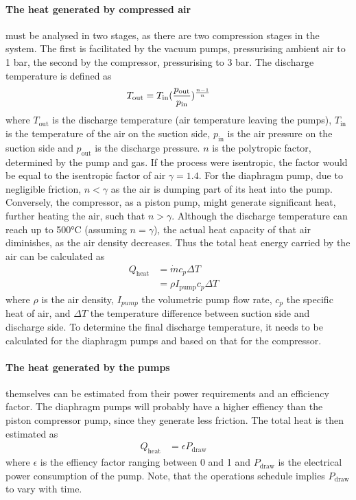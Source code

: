 \documentclass[
  a4paper,
  11pt,
  openany,
  parskip,
  toc=totoc,
  listof=totoc,
  bibliography=totoc
]{scrreprt}
\let\qty\relax
\newcommand{\qty}[1]{\left( #1 \right)}
\newcommand{\qc}{\quad}
\begin{document}
\paragraph{The heat generated by compressed air} must be analysed in two stages, as there are two compression stages in the system. The first is facilitated by the vacuum pumps, pressurising ambient air to 1 bar, the second by the compressor, pressurising to 3 bar. The discharge temperature is defined as 
\begin{align}
    T_\mathrm{out}&=T_\mathrm{in}\qty(\frac{p_\mathrm{out}}{p_\mathrm{in}})^{\frac{n-1}{n}}\qc
\end{align}
where $T_\mathrm{out}$ is the discharge temperature (air temperature leaving the pumps), $T_\mathrm{in}$ is the temperature of the air on the suction side, $p_\mathrm{in}$ is the air pressure on the suction side and $p_\mathrm{out}$ is the discharge pressure. $n$ is the polytropic factor, determined by the pump and gas. If the process were isentropic, the factor would be equal to the isentropic factor of air $\gamma=1.4$. For the diaphragm pump, due to negligible friction, $n<\gamma$ as the air is dumping part of its heat into the pump.
Conversely, the compressor, as a piston pump, might generate significant heat, further heating the air, such that $n>\gamma$.
Although the discharge temperature can reach up to 500°C (assuming $n=\gamma$), the actual heat capacity of that air diminishes, as the air density decreases. Thus the total heat energy carried by the air can be calculated as  
\begin{align}
    Q_\mathrm{heat} &= \dot{m}c_p\Delta T\\ 
    &= \rho I_\mathrm{pump} c_p\Delta T\qc
\end{align}
where $\rho$ is the air density, $I_{pump}$ the volumetric pump flow rate, $c_p$ the specific heat of air, and $\Delta T$ the temperature difference between suction side and discharge side. To determine the final discharge temperature, it needs to be calculated for the diaphragm pumps and based on that for the compressor.

\paragraph{The heat generated by the pumps} themselves can be estimated from their power requirements and an efficiency factor. The diaphragm pumps will probably have a higher effiency than the piston compressor pump, since they generate less friction. The total heat is then estimated as 
\begin{align}
    Q_\mathrm{heat} &= \epsilon P_\mathrm{draw}\qc
\end{align}
where $\epsilon$ is the effiency factor ranging between 0 and 1 and $P_\mathrm{draw}$ is the electrical power consumption of the pump. Note, that the operations schedule implies $P_\mathrm{draw}$ to vary with time.
\end{document}
